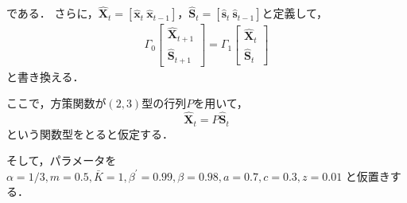 \documentclass[dvipdfmx]{jlreq}
\begin{document}
である．
さらに，$\widehat{\boldsymbol{X}}_t = [\widehat{\boldsymbol{x}}_t \ \widehat{\boldsymbol{x}}_{t-1}]$，$\widehat{\boldsymbol{S}}_t = [\widehat{\boldsymbol{s}}_t \ \widehat{\boldsymbol{s}}_{t-1}]$と定義して，
\begin{align} \label{eq:b}
  \Gamma_0
  \begin{bmatrix}
    \widehat{\boldsymbol{X}}_{t+1} \\
    \widehat{\boldsymbol{S}}_{t+1}
  \end{bmatrix}
  =
  \Gamma_1
  \begin{bmatrix}
    \widehat{\boldsymbol{X}}_{t} \\
    \widehat{\boldsymbol{S}}_{t}
  \end{bmatrix}
\end{align}
と書き換える．

ここで，方策関数が$(2, 3)$型の行列$P$を用いて，
\begin{equation} \label{eq:d}
  \widehat{\boldsymbol{X}}_t = P \widehat{\boldsymbol{S}}_t
\end{equation}
という関数型をとると仮定する．

そして，パラメータを
  $
  \alpha = 1/3,
  m = 0.5,
  \bar{K} = 1,
  \beta^\prime = 0.99,
  \beta = 0.98,
  a = 0.7,
  c = 0.3,
  z = 0.01
  $
と仮置きする．
\end{document}
